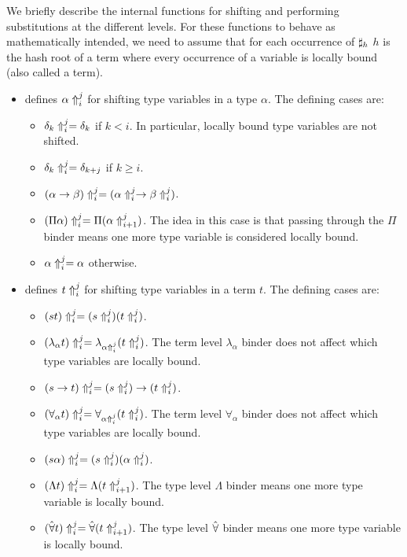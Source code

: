 We briefly describe the internal functions for shifting and performing substitutions at the different levels.
For these functions to behave as mathematically intended, we
need to assume that for each occurrence of $\tmh{h}$ 
$h$ is the hash root of a term where every occurrence of a variable is locally bound (also called a {} term).
\begin{itemize}
\item {} defines $\dbtpsh{i}{j}{\alpha}$ for shifting type variables in a type $\alpha$.
The defining cases are:
\begin{itemize}
\item $\dbtpsh{i}{j}{\delta_k} = \delta_k$ if $k<i$. In particular, locally bound type variables are not shifted.
\item $\dbtpsh{i}{j}{\delta_k} = \delta_{k+j}$ if $k\geq i$.
\item $\dbtpsh{i}{j}{(\alpha\to\beta)} = (\dbtpsh{i}{j}{\alpha} \to\dbtpsh{i}{j}{\beta})$.
\item $\dbtpsh{i}{j}{(\Pi\alpha)} = \Pi (\dbtpsh{i+1}{j}{\alpha})$. The idea in this case is that passing
through the $\Pi$ binder means one more type variable is considered locally bound.
\item $\dbtpsh{i}{j}{\alpha} = \alpha$ otherwise.
\end{itemize}
\item {} defines $\dbtpsh{i}{j}{t}$ for shifting type variables in a term $t$.
The defining cases are:
\begin{itemize}
\item $\dbtpsh{i}{j}{(st)} = (\dbtpsh{i}{j}{s}) (\dbtpsh{i}{j}{t})$.
\item $\dbtpsh{i}{j}{(\lambda_\alpha t)} = \lambda_{\dbtpsh{i}{j}{\alpha}} (\dbtpsh{i}{j}{t})$. The term level $\lambda_\alpha$ binder does not affect which type variables are locally bound.
\item $\dbtpsh{i}{j}{(s\to t)} = (\dbtpsh{i}{j}{s}) \to (\dbtpsh{i}{j}{t})$.
\item $\dbtpsh{i}{j}{(\forall_\alpha t)} = \forall_{\dbtpsh{i}{j}\alpha} (\dbtpsh{i}{j}{t})$. The term level $\forall_\alpha$ binder does not affect which type variables are locally bound.
\item $\dbtpsh{i}{j}{(s\alpha)} = (\dbtpsh{i}{j}{s}) (\dbtpsh{i}{j}\alpha)$.
\item $\dbtpsh{i}{j}{(\Lambda t)} = \Lambda (\dbtpsh{i+1}{j}{t})$. The type level $\Lambda$ binder means one more type variable is locally bound.
\item $\dbtpsh{i}{j}{(\tforall t)} = \tforall (\dbtpsh{i+1}{j}{t})$. The type level $\tforall$ binder means one more type variable is locally bound.

\end{itemize}
\end{itemize}
